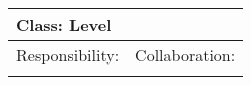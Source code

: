 \vspace{0.4cm}
\begin{tabular}{|p{7cm}|p{7cm}|} \hline
\multicolumn{2}{|l|}{Class:  Level} \\ \hline
Responsibility:  & Collaboration:  \\ \hline
 &  \\ 
\hline
\end{tabular}
\vspace{0.8cm}
